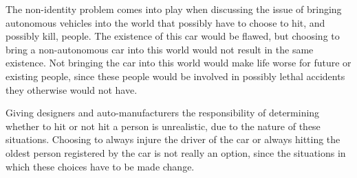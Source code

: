 \newpar The non-identity problem comes into play when discussing the issue of bringing autonomous vehicles into the world that possibly have to choose to hit, and possibly kill, people. The existence of this car would be flawed, but choosing to bring a non-autonomous car into this world would not result in the same existence. Not bringing the car into this world would make life worse for future or existing people, since these people would be involved in possibly lethal accidents they otherwise would not have.    

\newpar Giving designers and auto-manufacturers the responsibility of determining whether to hit or not hit a person is unrealistic, due to the nature of these situations. Choosing to always injure the driver of the car or always hitting the oldest person registered by the car is not really an option, since the situations in which these choices have to be made change. 
